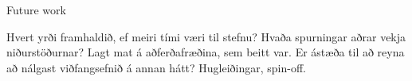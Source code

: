 Future work

Hvert yrði framhaldið, ef meiri tími væri til stefnu?  Hvaða spurningar aðrar vekja niðurstöðurnar?  Lagt mat á aðferðafræðina, sem beitt var.  Er ástæða til að reyna að nálgast viðfangsefnið á annan hátt?  Hugleiðingar, spin-off.



